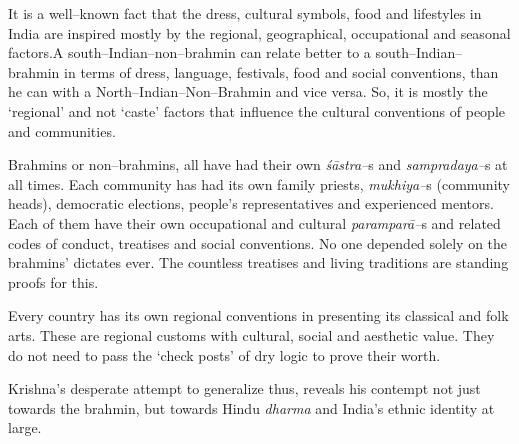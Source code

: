 It is a well–known fact that the dress, cultural symbols, food and lifestyles in India are inspired mostly by the regional, geographical, occupational and seasonal factors.A south–Indian–non–brahmin can relate better to a south–Indian–brahmin in terms of dress, language, festivals, food and social conventions, than he can with a North–Indian–Non–Brahmin and vice versa. So, it is mostly the ‘regional’ and not ‘caste’ factors that influence the cultural conventions of people and communities.

Brahmins or non–brahmins, all have had their own \textit{śāstra–}s and \textit{sampradaya–}s at all times. Each community has had its own family priests, \textit{mukhiya–}s (community heads), democratic elections, people’s representatives and experienced mentors. Each of them have their own occupational and cultural \textit{paramparā–}s and related codes of conduct, treatises and social conventions. No one depended solely on the brahmins’ dictates ever. The countless treatises and living traditions are standing proofs for this.

Every country has its own regional conventions in presenting its classical and folk arts. These are regional customs with cultural, social and aesthetic value. They do not need to pass the ‘check posts’ of dry logic to prove their worth.

Krishna’s desperate attempt to generalize thus, reveals his contempt not just towards the brahmin, but towards Hindu \textit{dharma} and India’s ethnic identity at large.


